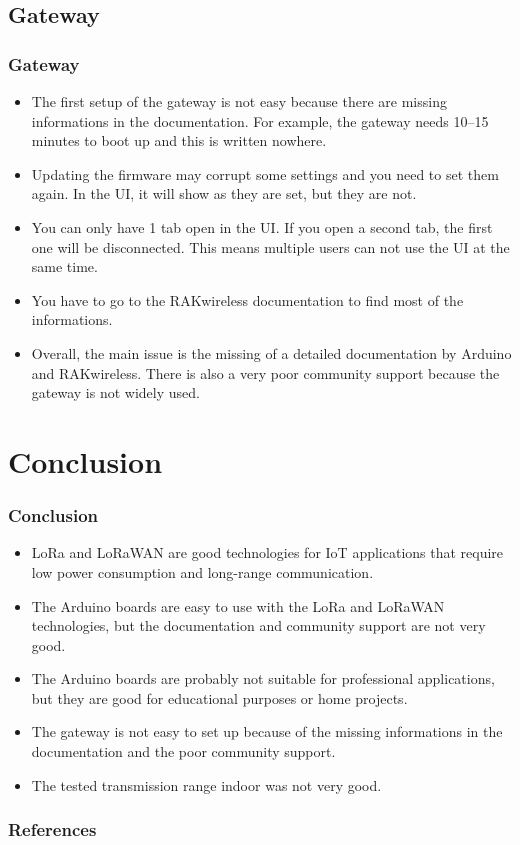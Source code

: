 \documentclass{beamer}
\begin{document}
\subsection{Gateway}
\begin{frame}
    \frametitle{Gateway}
    \begin{itemize}[<+->]
        \item The first setup of the gateway is not easy because there are missing
              informations in the documentation. For example, the gateway needs 10–15 minutes
              to boot up and this is written nowhere.
        \item Updating the firmware may corrupt some settings and you need to set them again.
              In the UI, it will show as they are set, but they are not.
        \item You can only have 1 tab open in the UI\@. If you open a second tab, the first
              one will be disconnected. This means multiple users can not use the UI at the
              same time.
        \item You have to go to the RAKwireless documentation to find most of the
              informations.
        \item Overall, the main issue is the missing of a detailed documentation by Arduino
              and RAKwireless. There is also a very poor community support because the
              gateway is not widely used.
    \end{itemize}
\end{frame}

\section{Conclusion}
\begin{frame}
    \frametitle{Conclusion}
    \begin{itemize}[<+->]
        \item LoRa and LoRaWAN are good technologies for IoT applications that require low
              power consumption and long-range communication.
        \item The Arduino boards are easy to use with the LoRa and LoRaWAN technologies, but
              the documentation and community support are not very good.
        \item The Arduino boards are probably not suitable for professional applications, but
              they are good for educational purposes or home projects.
        \item The gateway is not easy to set up because of the missing informations in the
              documentation and the poor community support.
        \item The tested transmission range indoor was not very good.
    \end{itemize}
\end{frame}

\begin{frame}
    \nocite{*}
    \frametitle{References}
    
    
\end{frame}
\end{document}
